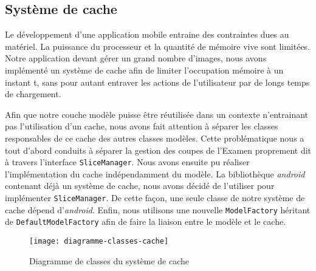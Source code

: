 \subsection{Système de cache}

Le développement d'une application mobile entraine des contraintes dues au matériel. La puissance du processeur et la quantité de mémoire vive sont limitées. Notre application devant gérer un grand nombre d'images, nous avons implémenté un système de cache afin de limiter l'occupation mémoire à un instant t, sans pour autant entraver les actions de l'utilisateur par de longs temps de chargement.

Afin que notre couche modèle puisse être réutilisée dans un contexte n'entrainant pas l'utilisation d'un cache, nous avons fait attention à séparer les classes responsables de ce cache des autres classes modèles. Cette problématique nous a tout d'abord conduits à séparer la gestion des coupes de l'Examen proprement dit à travers l'interface \verb+SliceManager+. Nous avons ensuite pu réaliser l'implémentation du cache indépendamment du modèle. La bibliothèque \emph{android} contenant déjà un système de cache, nous avons décidé de l'utiliser pour implémenter \verb+SliceManager+. De cette façon, une seule classe de notre système de cache dépend d'\emph{android}. Enfin, nous utilisons une nouvelle \verb+ModelFactory+ héritant de \verb+DefaultModelFactory+ afin de faire la liaison entre le modèle et le cache.

\begin{figure}[h]
\begin{center}
	\texttt{[image: diagramme-classes-cache]}
\end{center}
	\caption{Diagramme de classes du système de cache}
	\label{classes-cache}
\end{figure}